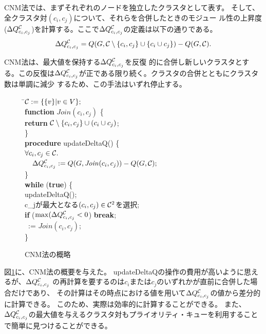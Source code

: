 \documentclass [a4j,11pt] {jsarticle}
\begin{document}
CNM法では、まずそれぞれのノードを独立したクラスタとして表す。
そして、全クラスタ対$(c_i, c_j)$について、それらを合併したときのモジュー
ル性の上昇度($\Delta Q^{{\cal C}}_{c_i,c_j}$)を計算する。ここで$
\Delta Q^{{\cal C}}_{c_i,c_j}$の定義は以下の通りである。
%
\[ \Delta Q^{{\cal C}}_{c_i,c_j} =
   Q(G,{\cal C} \setminus \{c_i, c_j\} \cup \{c_i \cup c_j\}) -
   Q(G, {\cal C}). \]


CNM法は、最大値を保持する$\Delta Q^{{\cal C}}_{c_i,c_j}$を反復
的に合併し新しいクラスタとする。この反復は$\Delta Q^{{\cal C}}_{c_i,c_j}$が正である限り続く。クラスタの合併とともにクラスタ数は単調に減少
するため、この手法はいずれ停止する。

\begin {figure}
\begin {tabbing}
\hspace {.3\linewidth}\=${\cal C} := \{\{v\} | v \in V\};$ \medskip\\
\>\textbf {function} $\mathit {Join}(c_i, c_j)$ \{\\
\>\quad \=\textbf {return} ${\cal C} \setminus \{c_i, c_j\} \cup (c_i \cup c_j)$; \\
\>\} \medskip\\
\>\textbf {procedure} updateDeltaQ() \{\\
\>\>$\forall c_i, c_j \in {\cal C}.$\\
\>\>$\quad\Delta Q^{{\cal C}}_{c_i,c_j}:=Q(G, \mathit {Join}(c_i, c_j)) - Q(G, {\cal C});$\\
\>\} \medskip\\
\>\textbf {while} (\textbf {true}) \{\\
\>\>updateDeltaQ(); \\
\>\>\DQ {} {c_j}が最大となる$(c_i, c_j) \in {\cal C}^2 $を選択;\\
\>\>\textbf {if} ($\max(\Delta Q^{{\cal C}}_{c_i,c_j} < 0$) \textbf {break};\medskip\\
\>\>\clustering\ := $\mathit {Join}(c_i, c_j)$;\\
\>\}
\end {tabbing}
\caption {CNM法\cite{Clauset04}の概略}
\label {fig: cnm algorithm}
\end {figure}

図\ref{fig: cnm algorithm}に、CNM法の概要を与えた。
updateDeltaQの操作の費用が高いように思えるが、$\Delta Q^{{\cal C}}_{c_i,c_j}$
の再計算を要するのは${c_i}$または${c_j}$のいずれかが直前に合併した場合だけであり、
その計算はその時点における値を用いて$\Delta Q^{{\cal C}}_{c_i,c_j}$の値から差分的に計算できる。
このため、実際は効率的に計算することができる。
また、$\Delta Q^{{\cal C}}_{c_i,c_j}$の最大値を与えるクラスタ対もプライオリティ・キューを利用することで簡単に見つけることができる。
\end{document}
